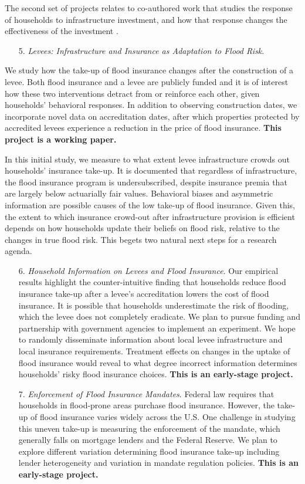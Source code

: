 The second set of projects relates to co-authored work that studies the response of households to infrastructure investment, and how that response changes the effectiveness of the investment \citep{vinnakota_levees_2023}. 


\begin{enumerate}
\item[5.] \textit{Levees: Infrastructure and Insurance as Adaptation to Flood Risk}.
\end{enumerate}

We study how the take-up of flood insurance changes after the construction of a levee. Both flood insurance and a levee are publicly funded and it is of interest how these two interventions detract from or reinforce each other, given households’ behavioral responses. In addition to observing construction dates, we incorporate novel data on accreditation dates, after which properties protected by accredited levees experience a reduction in the price of flood insurance. \textbf{This project is a working paper.}

In this initial study, we measure to what extent levee infrastructure crowds out households’ insurance take-up. It is documented that regardless of infrastructure, the flood insurance program is undersubscribed, despite insurance premia that are largely below actuarially fair values. Behavioral biases and asymmetric information are possible causes of the low take-up of flood insurance. Given this, the extent to which insurance crowd-out after infrastructure provision is efficient depends on how households update their beliefs on flood risk, relative to the changes in true flood risk. This begets two natural next steps for a research agenda.

\begin{enumerate}
\item[6.] \textit{Household Information on Levees and Flood Insurance}. Our empirical results highlight the counter-intuitive finding that households reduce flood insurance take-up after a levee’s accreditation lowers the cost of flood insurance. It is possible that households underestimate the risk of flooding, which the levee does not completely eradicate. We plan to pursue funding and partnership with government agencies to implement an experiment. We hope to randomly disseminate information about local levee infrastructure and local insurance requirements. Treatment effects on changes in the uptake of flood insurance would reveal to what degree incorrect information determines households’ risky flood insurance choices. \textbf{This is an early-stage project.}
\item[7.] \textit{Enforcement of Flood Insurance Mandates}. Federal law requires that households in flood-prone areas purchase flood insurance. However, the take-up of flood insurance varies widely across the U.S. One challenge in studying this uneven take-up is measuring the enforcement of the mandate, which generally falls on mortgage lenders and the Federal Reserve. We plan to explore different variation determining flood insurance take-up including lender heterogeneity and variation in mandate regulation policies. \textbf{This is an early-stage project.}
\end{enumerate}

